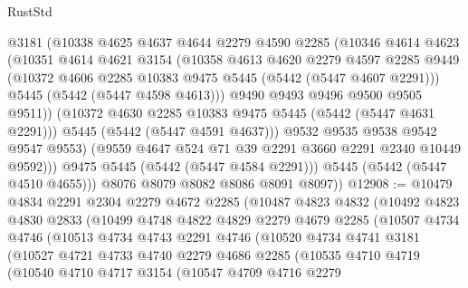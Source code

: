 \begin{lexlean}{RustStd}
\begin{coremodule}
{\begin{coremodule}
{{{{{{{{{{{{                  @3181
                  (@10338
                    @4625
                    @4637
                    @4644
                    @2279
                    @4590
                    @2285
                    (@10346
                      @4614
                      @4623
                      (@10351
                        @4614
                        @4621
                        @3154
                        (@10358
                          @4613
                          @4620
                          @2279
                          @4597
                          @2285
                          @9449
                          (@10372 @4606 @2285 @10383 @9475 @5445 (@5442 (@5447 @4607 @2291)))
                          @5445
                          (@5442 (@5447 @4598 @4613)))
                        @9490
                        @9493
                        @9496
                        @9500
                        @9505
                        @9511))
                    (@10372 @4630 @2285 @10383 @9475 @5445 (@5442 (@5447 @4631 @2291)))
                    @5445
                    (@5442 (@5447 @4591 @4637)))
                  @9532
                  @9535
                  @9538
                  @9542
                  @9547
                  @9553)
                (@9559 @4647 @524 @71 @39 @2291 @3660 @2291 @2340 @10449 @9592)))
            @9475
            @5445
            (@5442 (@5447 @4584 @2291)))
          @5445
          (@5442 (@5447 @4510 @4655)))
        @8076
        @8079
        @8082
        @8086
        @8091
        @8097))
@12908 := @10479
    @4834
    @2291
    @2304
    @2279
    @4672
    @2285
    (@10487
      @4823
      @4832
      (@10492
        @4823
        @4830
        @2833
        (@10499
          @4748
          @4822
          @4829
          @2279
          @4679
          @2285
          (@10507
            @4734
            @4746
            (@10513
              @4734
              @4743
              @2291
              @4746
              (@10520
                @4734
                @4741
                @3181
                (@10527
                  @4721
                  @4733
                  @4740
                  @2279
                  @4686
                  @2285
                  (@10535
                    @4710
                    @4719
                    (@10540
                      @4710
                      @4717
                      @3154
                      (@10547
                        @4709
                        @4716
                        @2279
}}}}}}}}}}}}
\end{coremodule}}
\end{coremodule}
\end{lexlean}
